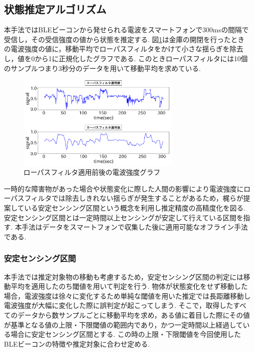 \documentclass[Japanese]{dicomopapers}
\begin{document}

\subsection{状態推定アルゴリズム}
本手法ではBLEビーコンから発せられる電波をスマートフォンで300msの間隔で受信し，その受信強度の値から状態を推定する.
図\ref{bank-opcl}は金庫の開閉を行ったときの電波強度の値に，移動平均でローパスフィルタをかけて小さな揺らぎを除去し，値を0から1に正規化したグラフである.
このときローパスフィルタには10個のサンプルつまり3秒分のデータを用いて移動平均を求めている.


\begin{figure}[tbh]
 \centering
 \includegraphics[width=8cm]{lowpath_compare.png}
 \caption{ローパスフィルタ適用前後の電波強度グラフ}
 \label{bank-opcl}
\end{figure}


一時的な障害物があった場合や状態変化に際した人間の影響により電波強度にローパスフィルタでは除去しきれない揺らぎが発生することがあるため，梶ら\cite{sensing-area}が提案している安定センシング区間という概念を利用し推定精度の高精度化を図る.
安定センシング区間とは一定時間以上センシングが安定して行えている区間を指す.
本手法はデータをスマートフォンで収集した後に適用可能なオフライン手法である.


\subsubsection{安定センシング区間}
本手法では推定対象物の移動も考慮するため，安定センシング区間の判定には移動平均を適用したのち閾値を用いて判定を行う.
物体が状態変化をせず移動した場合，電波強度は徐々に変化するため単純な閾値を用いた推定では長距離移動し電波強度が大幅に変化した際に誤判定が起こってしまう.
そこで，取得したすべてのデータから数サンプルごとに移動平均を求め，ある値に着目した際にその値が基準となる値の上限・下限閾値の範囲内であり，かつ一定時間以上経過している場合に安定センシング区間とする.
この時の上限・下限閾値を今回使用したBLEビーコンの特徴や推定対象に合わせ定める.
\end{document}
